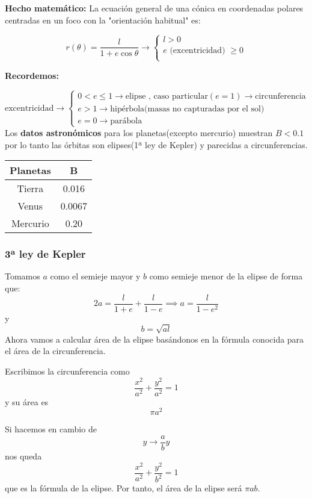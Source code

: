 \textbf{Hecho matemático:} La ecuación general de una cónica en coordenadas polares centradas en un foco con la "orientación habitual" es:

$$r(\theta) = \frac{l}{1+e\cos\theta} \rightarrow
\begin{cases}
l>0\\
e\text{ (excentricidad) }\ge0\\
\end{cases}
$$

\textbf{Recordemos:}

$$\text{excentricidad} \rightarrow
\begin{cases}
0 < e \leq 1 \rightarrow \text{elipse , caso particular} (e=1) \rightarrow \text{circunferencia}\\
e>1 \rightarrow \text{hipérbola(masas no capturadas por el sol)}\\
e=0 \rightarrow \text{parábola}
\end{cases}
$$
Los \textbf{datos astronómicos} para los planetas(excepto mercurio) muestran $B<0.1$ por lo tanto las órbitas son elipses(1ª ley de Kepler) y parecidas a circunferencias.

\begin{center}
\begin{tabular}{| c | c |}
	\hline
	Planetas & B \\
	\hline
	Tierra & 0.016 \\
	\hline
	Venus & 0.0067 \\
	\hline
	Mercurio & 0.20\\
	\hline
\end{tabular}
\end{center}


\subsubsection{3ª ley de Kepler}
Tomamos $a$ como el semieje mayor y $b$ como semieje menor de la elipse de forma que:
$$2a = \frac{l}{1+e} + \frac{l}{1-e} \implies a= \frac{l}{1-e^2}$$
y
$$b = \sqrt{al}$$
Ahora vamos a calcular área de la elipse basándonos en la fórmula conocida para el área de la circunferencia.

Escribimos la circunferencia como
\[\frac{x^2}{a^2} + \frac{y^2}{a^2} = 1\]
y su área es
\[\pi a^2\]

Si hacemos en cambio de
\[y \rightarrow \frac{a}{b}y\]
nos queda
\[\frac{x^2}{a^2} + \frac{y^2}{b^2} = 1\]
que es la fórmula de la elipse. Por tanto, el área de la elipse será $\pi ab$.

